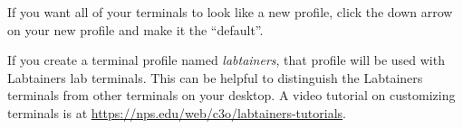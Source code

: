 \documentclass[12pt]{article}
\begin{document}
\begin{appendices}
If you want all of your terminals to look like a new profile, click the down arrow on your new profile and make it the ``default''.

If you create a terminal profile named \textit{labtainers}, that profile will be used with Labtainers lab terminals.  This can 
be helpful to distinguish the Labtainers terminals from other terminals on your desktop.
A video tutorial on customizing terminals is at \url{https://nps.edu/web/c3o/labtainers-tutorials}.

\end{appendices}
\end{document}

